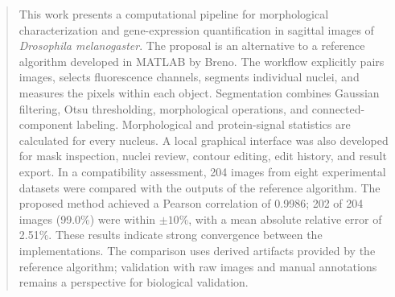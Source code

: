 \documentclass{bsi}
\begin{document}
	\begin{abstract}

    This work presents a computational pipeline for morphological characterization and gene-expression quantification in sagittal images of \textit{Drosophila melanogaster}. The proposal is an alternative to a reference algorithm developed in MATLAB by Breno. The workflow explicitly pairs images, selects fluorescence channels, segments individual nuclei, and measures the pixels within each object. Segmentation combines Gaussian filtering, Otsu thresholding, morphological operations, and connected-component labeling. Morphological and protein-signal statistics are calculated for every nucleus. A local graphical interface was also developed for mask inspection, nuclei review, contour editing, edit history, and result export. In a compatibility assessment, 204 images from eight experimental datasets were compared with the outputs of the reference algorithm. The proposed method achieved a Pearson correlation of 0.9986; 202 of 204 images (99.0\%) were within $\pm 10\%$, with a mean absolute relative error of 2.51\%. These results indicate strong convergence between the implementations. The comparison uses derived artifacts provided by the reference algorithm; validation with raw images and manual annotations remains a perspective for biological validation.

    \end{abstract}
		
	\listailustracoes
	
	\listatabelas
	
	
	\sumario
	
	\mainmatter
	
	
	
	
	
	
	
    
	
	
\end{document}
